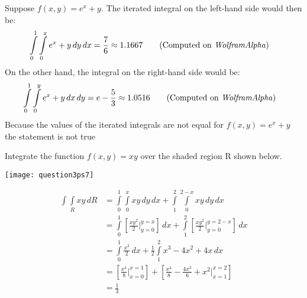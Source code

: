 \documentclass[12pt,letterpaper, onecolumn]{exam}
\newcommand{\Int}{\int\limits}
\begin{document}
\begin{questions}
\begin{solution}
		Suppose $f(x,y)=e^x+y$. The iterated integral on the left-hand side would then be:
			\begin{align*}
			\Int_{0}^{1} \Int_{0}^{x}e^x+y \,dy\,dx&=\frac{7}{6}\approx 1.1667\tag{Computed on \textit{WolframAlpha}}
		\end{align*}
		On the other hand, the integral on the right-hand side would be:
		\begin{align*}
			\Int_{0}^{1} \Int_{0}^{y}e^x+y \,dx\,dy&=e-\frac{5}{3}\approx 1.0516\tag{Computed on \textit{WolframAlpha}}
		\end{align*}
		Because the values of the iterated integrals are not equal for $f(x,y)=e^x+y$ the statement is not true
	\end{solution}
	\question Integrate the function $f(x,y)=xy$ over the shaded region R shown below.
	\begin{center}
		\texttt{[image: question3ps7]}
	\end{center}
	\begin{solution}
		\begin{align*}
				\Int\Int_R xy \,dR&=\Int_{0}^{1} \Int_{0}^{x}xy \,dy\,dx+\Int_{1}^{2} \Int_{0}^{2-x}xy \,dy\,dx\\
				&=\Int_{0}^{1} \left[\frac{xy^2}{2}\Big|_{y=0}^{y=x}\right]\,dx+\Int_{1}^{2}\left[\frac{xy^2}{2}\Big|_{y=0}^{y=2-x}\right]\,dx\\
				&=\Int_{0}^{1} \frac{x^3}{2} \,dx + \frac{1}{2}\Int_{1}^{2} x^3-4x^2+4x\,dx\\
				&=\left[\frac{x^4}{8}\Big|_{x=0}^{x=1}\right]+\left[\frac{x^4}{8}-\frac{4x^3}{6}+x^2\Big|_{x=1}^{x=2}\right]\\
				&=\frac{1}{3}
		\end{align*}
   \end{solution}
	\question {}
	\begin{solution}
		\begin{parts}

\end{parts}
\end{solution}
\end{questions}
\end{document}

